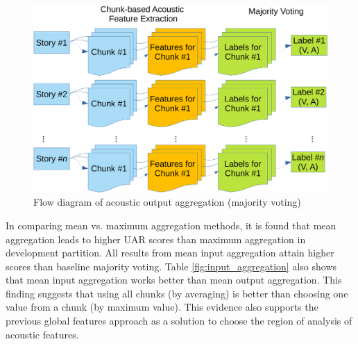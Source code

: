 \begin{figure}
  \centering
  \includegraphics[width=.7\textwidth]{../fig/majority_voting-crop.pdf}
  \caption{Flow diagram of acoustic output aggregation (majority voting)}
  \label{fig:output_aggregation}
\end{figure}



In comparing mean vs. maximum aggregation methods, it is found that mean
aggregation leads to higher UAR scores than maximum aggregation in development
partition. All results from mean input aggregation attain higher scores than
baseline majority voting. Table \ref{fig:input_aggregation} also shows that
mean input aggregation works better than mean output aggregation. This finding
suggests that using all chunks (by averaging) is better than choosing one value
from a chunk (by maximum value). This evidence also supports the previous
global features approach as a solution to choose the region of analysis of
acoustic features.


